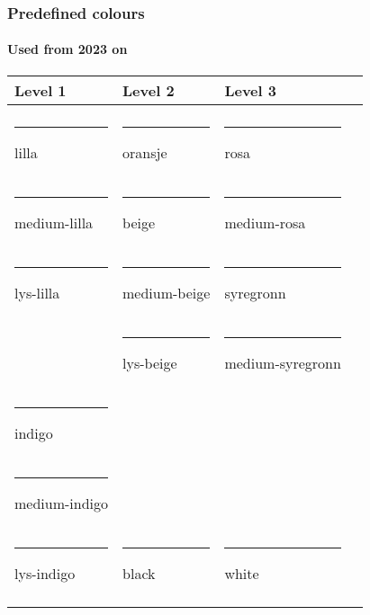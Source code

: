 \documentclass[aspectratio=169]{beamer}
\begin{document}
\begin{frame}
\frametitle{Predefined colours}
\framesubtitle{Used from 2023 on}
\centering

\begin{tabular}{llll}
  Level 1                                              & Level 2                                            & Level 3                                                    \\
  \hline                                                                                                                                                                 \\
  {\color{lilla}\rule{3em}{2ex}} lilla                 & {\color{oransje}\rule{3em}{2ex}} oransje           & {\color{rosa}\rule{3em}{2ex}} rosa                         \\
  {\color{medium-lilla}\rule{3em}{2ex}} medium-lilla   & {\color{beige}\rule{3em}{2ex}} beige               & {\color{medium-rosa}\rule{3em}{2ex}} medium-rosa           \\
  {\color{lys-lilla}\rule{3em}{2ex}} lys-lilla         & {\color{medium-beige}\rule{3em}{2ex}} medium-beige & {\color{syregronn}\rule{3em}{2ex}} syregronn               \\
                                                       & {\color{lys-beige}\rule{3em}{2ex}} lys-beige       & {\color{medium-syregronn}\rule{3em}{2ex}} medium-syregronn \\
  {\color{indigo}\rule{3em}{2ex}} indigo               &                                                    &                                                            \\
  {\color{medium-indigo}\rule{3em}{2ex}} medium-indigo &                                                    &                                                            \\
  {\color{lys-indigo}\rule{3em}{2ex}} lys-indigo       & {\color{black}\rule{3em}{2ex}} black               & {\color{white}\rule{3em}{2ex}} white                       \\
  \hline                                                                                                                                                                 \\
\end{tabular}

\end{frame}
\end{document}
